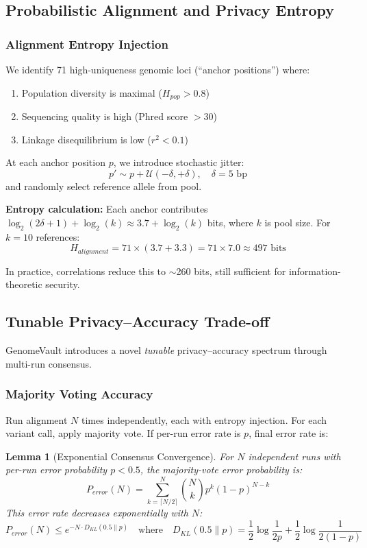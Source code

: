 \documentclass[12pt,a4paper]{article}
\newtheorem{lemma}[theorem]{Lemma}
\begin{document}
\subsection{Probabilistic Alignment and Privacy Entropy}

\subsubsection{Alignment Entropy Injection}

We identify 71 high-uniqueness genomic loci (``anchor positions'') where:
\begin{enumerate}
\item Population diversity is maximal ($H_{pop} > 0.8$)
\item Sequencing quality is high (Phred score $> 30$)
\item Linkage disequilibrium is low ($r^2 < 0.1$)
\end{enumerate}

At each anchor position $p$, we introduce stochastic jitter:
\[
p' \sim p + \mathcal{U}(-\delta, +\delta), \quad \delta = 5 \text{ bp}
\]
and randomly select reference allele from pool.

\textbf{Entropy calculation:} Each anchor contributes $\log_2(2\delta + 1) + \log_2(k) \approx 3.7 + \log_2(k)$ bits, where $k$ is pool size. For $k = 10$ references:
\[
H_{alignment} = 71 \times (3.7 + 3.3) = 71 \times 7.0 \approx 497 \text{ bits}
\]

In practice, correlations reduce this to $\sim$260 bits, still sufficient for information-theoretic security.

\subsection{Tunable Privacy--Accuracy Trade-off}

GenomeVault introduces a novel \textit{tunable} privacy--accuracy spectrum through multi-run consensus.

\subsubsection{Majority Voting Accuracy}

Run alignment $N$ times independently, each with entropy injection. For each variant call, apply majority vote. If per-run error rate is $p$, final error rate is:

\begin{lemma}[Exponential Consensus Convergence]
\label{lemma:consensus_convergence}
For $N$ independent runs with per-run error probability $p < 0.5$, the majority-vote error probability is:
\[
P_{error}(N) = \sum_{k=\lceil N/2 \rceil}^{N} \binom{N}{k} p^k (1-p)^{N-k}
\]
This error rate decreases exponentially with $N$:
\[
P_{error}(N) \leq e^{-N \cdot D_{KL}(0.5 \parallel p)} \quad \text{where} \quad D_{KL}(0.5 \parallel p) = \frac{1}{2}\log\frac{1}{2p} + \frac{1}{2}\log\frac{1}{2(1-p)}
\]
\end{lemma}
\end{document}
